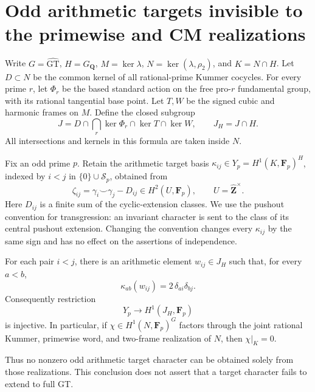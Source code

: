 \section{Odd arithmetic targets invisible to the primewise and CM realizations}

Write \(G=\widehat{\mathrm{GT}}\), \(H=G_{\mathbf Q}\),
\(M=\ker\lambda\), \(N=\ker(\lambda,\rho_2)\), and
\(K=N\cap H\).  Let \(D\subset N\) be the common kernel of
all rational-prime Kummer cocycles.  For every prime \(r\), let
\(\Phi_r\) be the based standard action on the free pro-\(r\)
fundamental group, with its rational tangential base point.
Let \(T,W\) be the signed cubic and harmonic frames on \(M\).
Define the closed subgroup
\begin{equation}\label{eq:odd-mixed-common-kernel}
 J=D\cap\bigcap_r\ker\Phi_r\cap\ker T\cap\ker W,
 \qquad J_H=J\cap H.
\end{equation}
All intersections and kernels in this formula are taken inside \(N\).

Fix an odd prime \(p\).  Retain the arithmetic target basis
\(\kappa_{ij}\in Y_p=H^1(K,\mathbf F_p)^H\), indexed by
\(i<j\) in \(\{0\}\cup\mathcal S_p\), obtained from
\[
 \zeta_{ij}=\gamma_i\smile\gamma_j-D_{ij}
                      \in H^2(U,\mathbf F_p),
 \qquad U=\widehat{\mathbf Z}^{\times}.
\]
Here \(D_{ij}\) is a finite sum of the cyclic-extension classes.
We use the pushout convention for transgression: an invariant
character is sent to the class of its central pushout extension.
Changing the convention changes every \(\kappa_{ij}\) by the
same sign and has no effect on the assertions of independence.

\begin{theorem}\label{thm:odd-target-survives-all-standard-kernels}
For each pair \(i<j\), there is an arithmetic element
\(w_{ij}\in J_H\) such that, for every \(a<b\),
\begin{equation}\label{eq:odd-mixed-evaluation}
                  \kappa_{ab}(w_{ij})=2\,\delta_{ai}\delta_{bj}.
\end{equation}
Consequently restriction
\[
                         Y_p\longrightarrow H^1(J_H,\mathbf F_p)
\]
is injective.  In particular, if \(\chi\in H^1(N,\mathbf F_p)^G\)
factors through the joint rational Kummer, primewise word, and
two-frame realization of \(N\), then \(\chi|_K=0\).

Thus no nonzero odd arithmetic target character can be obtained
solely from those realizations.  This conclusion does not assert
that a target character fails to extend to full GT.
\end{theorem}

